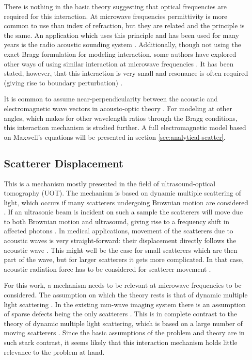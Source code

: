 \documentclass[11pt,twoside]{eitExjobb}
\begin{document}
	There is nothing in the basic theory suggesting that optical frequencies are required for this interaction. At microwave frequencies permittivity is more common to use than index of refraction, but they are related and the principle is the same. An application which uses this principle and has been used for many years is the radio acoustic sounding system \cite{Buerkle2007}. Additionally, though not using the exact Bragg formulation for modeling interaction, some authors have explored other ways of using similar interaction at microwave frequencies \cite{Lawrence2001}\cite{Merkel2006}. It has been stated, however, that this interaction is very small and resonance is often required (giving rise to boundary perturbation) \cite{Buerkle2007}.
	
	It is common to assume near-perpendicularity between the acoustic and electromagnetic wave vectors in acousto-optic theory \cite{Korpel1988}. For modeling at other angles, which makes for other wavelength ratios through the Bragg conditions, this interaction mechanism is studied further. A full electromagnetic model based on Maxwell's equations will be presented in section \ref{sec:analytical-scatter}.
	
	\subsection{Scatterer Displacement}
	This is a mechanism mostly presented in the field of ultrasound-optical tomography (UOT). The mechanism is based on dynamic multiple scattering of light, which occurs if many scatterers undergoing Brownian motion are considered \cite{Leutz1995}. If an ultrasonic beam is incident on such a sample the scatterers will move due to both Brownian motion and ultrasound, giving rise to a frequency shift in affected photons \cite{Leutz1995}\cite{Elson2011}. In medical applications, movement of the scatterers due to acoustic waves is very straight-forward: their displacement directly follows the acoustic wave \cite{Leutz1995}. This might well be the case for small scatterers which are then part of the wave, but for larger scatterers it gets more complicated. In that case, acoustic radiation force has to be considered for scatterer movement \cite{Torr1984}. 
	
	For this work, a mechanism needs to be relevant at microwave frequencies to be considered. The assumption on which the theory rests is that of dynamic multiple light scattering \cite{Leutz1995}. In the existing mm-wave imaging system there is an assumption of sparse defects being the only scatterers \cite{Helander2017}. This is in complete contrast to the theory of dynamic multiple light scattering, which is based on a large number of moving scatterers \cite{Leutz1995}. Since the basic assumptions of the problem and theory are in such stark contrast, it seems likely that this interaction mechanism holds little relevance to the problem at hand.
	
\end{document}
